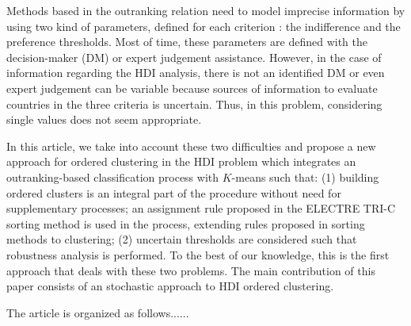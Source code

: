 \documentclass[]{elsarticle}
\theoremstyle{definition}
\begin{document}
Methods based in the outranking relation need to model imprecise information by using two kind of parameters, defined for each criterion \citep{figueira2010}: the indifference and the preference thresholds. Most of time, these parameters are defined  with the decision-maker (DM) or expert judgement assistance. However, in the case of information regarding the HDI analysis, there is not an identified DM or even expert judgement can be variable because sources of information to evaluate countries in the three criteria is uncertain.  Thus, in this problem, considering single values does not seem appropriate.   

In this article, we take into account these two difficulties and propose a new approach for ordered clustering in the HDI problem which integrates an outranking-based classification process with $K$-means such that:  (1) building ordered clusters is an integral part of the procedure without need for supplementary processes; an assignment rule proposed in the ELECTRE TRI-C sorting method \citep{almeida2008,Almeida2012} is used in the process, extending rules proposed in sorting methods to clustering; (2) uncertain thresholds are considered such that robustness analysis is performed. To the best of our knowledge, this is the first approach that deals with these two problems.  The main contribution of this paper consists of an stochastic approach to HDI ordered clustering.

The article is organized as follows......
\end{document}
